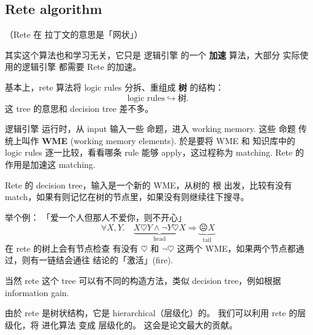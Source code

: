 \subsection{Rete algorithm}

（Rete 在 拉丁文的意思是「网状」）

其实这个算法也和学习无关，它只是 逻辑引擎 的一个 \textbf{加速} 算法，大部分 实际使用的逻辑引擎 都需要 Rete 的加速。

基本上，rete 算法将 logic rules 分拆、重组成 \textbf{树} 的结构：
\begin{equation}
\boxed{\text{logic rules}} \hookrightarrow \boxed{\text{树}} .
\end{equation}
这 tree 的意思和 decision tree 差不多。

逻辑引擎 运行时，从 input 输入一些 命题，进入 working memory.  这些 命题 传统上叫作 \textbf{WME} (working memory elements).  於是要将 WME 和 知识库中的 logic rules 逐一比较，看看哪条 rule 能够 apply，这过程称为 matching.  Rete 的作用是加速这 matching.

Rete 的 decision tree，输入是一个新的 WME，从树的 根 出发，比较有没有 match，如果有则记忆在树的节点里，如果没有则继续往下搜寻。

举个例： 「爱一个人但那人不爱你，则不开心」
\begin{equation}
\forall X, Y.  \quad \underbrace{X \heartsuit Y \wedge \neg Y \heartsuit X}_{\mbox{head}} \Rightarrow \underbrace{\frownie X}_{\mbox{tail}}
\end{equation}
在 rete 的树上会有节点检查 有没有 $\heartsuit$ 和 $\neg \heartsuit$ 这两个 WME，如果两个节点都通过，则有一链结会通往 结论的「激活」(fire). 

当然 rete 这个 tree 可以有不同的构造方法，类似 decision tree，例如根据 information gain. 

由於 rete 是树状结构，它是 hierarchical（层级化）的。 我们可以利用 rete 的层级化，将 进化算法 变成 层级化的。 这会是论文最大的贡献。


